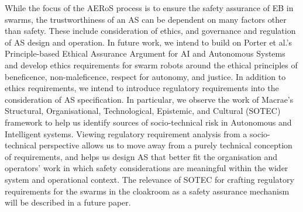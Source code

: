 \documentclass[runningheads]{llncs}
\begin{document}
% 
%

While the focus of the AERoS process is to ensure the safety assurance of EB in swarms, the trustworthiness of an AS can be dependent on many factors other than safety. These include consideration of ethics, and governance and regulation of AS design and operation. 
In future work, we intend to build on Porter et al.’s \cite{Porter2022} Principle-based Ethical Assurance Argument for AI and Autonomous Systems and develop ethics requirements for swarm robots around the ethical principles of beneficence, non-maleficence, respect for autonomy, and justice. 
In addition to ethics requirements, we intend to introduce regulatory requirements into the consideration of AS specification. In particular, we observe the work of Macrae’s~\cite{macrae2021learning} Structural, Organisational, Technological, Epistemic, and Cultural (SOTEC) framework to help us identify sources of socio-technical risk in Autonomous and Intelligent systems. Viewing regulatory requirement analysis from a socio-technical perspective allows us to move away from a purely technical conception of requirements, and helps us design AS that better fit the organisation and operators’ work in which safety considerations are meaningful within the wider system and operational context. The relevance of SOTEC for crafting regulatory requirements for the swarms in the cloakroom as a safety assurance mechanism will be described in a future paper. 
\end{document}
